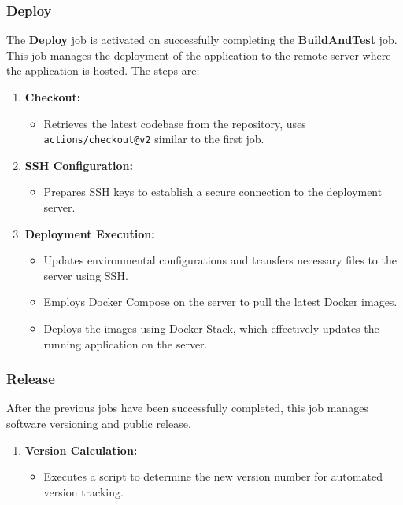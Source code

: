\documentclass[12pt, a4paper, oneside]{book}
\begin{document}
\begin{spacing}{1.5}
\subsubsection{Deploy}
The \textbf{Deploy} job is activated on successfully completing the \textbf{BuildAndTest} job. This job manages the deployment of the application to the remote server where the application is hosted. The steps are:

\begin{enumerate}
    \item \textbf{Checkout:} 
    \begin{itemize}
        \item Retrieves the latest codebase from the repository, uses \texttt{actions/checkout@v2} similar to the first job.
    \end{itemize}
    
    \item \textbf{SSH Configuration:} 
    \begin{itemize}
        \item Prepares SSH keys to establish a secure connection to the deployment server.
    \end{itemize}
    
    \item \textbf{Deployment Execution:}
    \begin{itemize}
        \item Updates environmental configurations and transfers necessary files to the server using SSH.
        \item Employs Docker Compose on the server to pull the latest Docker images.
        \item Deploys the images using Docker Stack, which effectively updates the running application on the server.
    \end{itemize}
\end{enumerate}

 \subsubsection{Release}
 After the previous jobs have been successfully completed, this job manages software versioning and public release.

 \begin{enumerate}
    \item \textbf{Version Calculation:}
    \begin{itemize}
        \item Executes a script to determine the new version number for automated version tracking.
    \end{itemize}
    

\end{enumerate}
\end{spacing}
\end{document}
